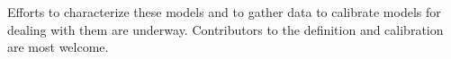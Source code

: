 \documentclass[smallcondesed]{svjour3}
\begin{document}
Efforts to characterize
these models and to gather data to calibrate models
for dealing with them are underway. Contributors
to the definition and calibration are most  welcome.  


 






\end{document}

